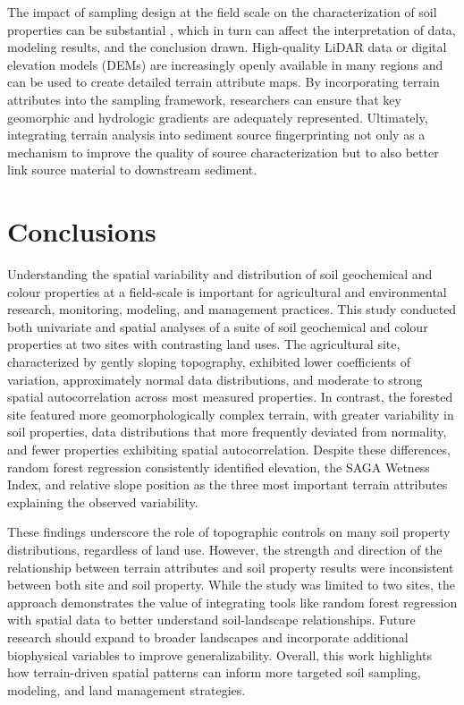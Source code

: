 \documentclass[
  number]{elsarticle}
\begin{document}
The impact of sampling design at the field scale on the characterization
of soil properties can be substantial \citep{lunamiño2024}, which in
turn can affect the interpretation of data, modeling results, and the
conclusion drawn. High-quality LiDAR data or digital elevation models
(DEMs) are increasingly openly available in many regions and can be used
to create detailed terrain attribute maps. By incorporating terrain
attributes into the sampling framework, researchers can ensure that key
geomorphic and hydrologic gradients are adequately represented.
Ultimately, integrating terrain analysis into sediment source
fingerprinting not only as a mechanism to improve the quality of source
characterization but to also better link source material to downstream
sediment.

\section{Conclusions}\label{conclusions}

Understanding the spatial variability and distribution of soil
geochemical and colour properties at a field-scale is important for
agricultural and environmental research, monitoring, modeling, and
management practices. This study conducted both univariate and spatial
analyses of a suite of soil geochemical and colour properties at two
sites with contrasting land uses. The agricultural site, characterized
by gently sloping topography, exhibited lower coefficients of variation,
approximately normal data distributions, and moderate to strong spatial
autocorrelation across most measured properties. In contrast, the
forested site featured more geomorphologically complex terrain, with
greater variability in soil properties, data distributions that more
frequently deviated from normality, and fewer properties exhibiting
spatial autocorrelation. Despite these differences, random forest
regression consistently identified elevation, the SAGA Wetness Index,
and relative slope position as the three most important terrain
attributes explaining the observed variability.

These findings underscore the role of topographic controls on many soil
property distributions, regardless of land use. However, the strength
and direction of the relationship between terrain attributes and soil
property results were inconsistent between both site and soil property.
While the study was limited to two sites, the approach demonstrates the
value of integrating tools like random forest regression with spatial
data to better understand soil-landscape relationships. Future research
should expand to broader landscapes and incorporate additional
biophysical variables to improve generalizability. Overall, this work
highlights how terrain-driven spatial patterns can inform more targeted
soil sampling, modeling, and land management strategies.
\end{document}
